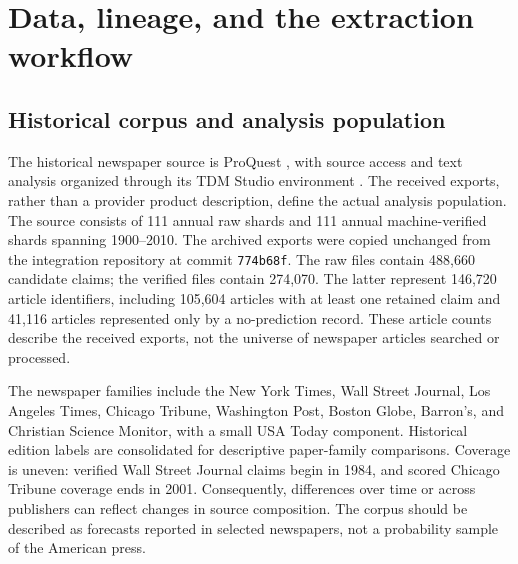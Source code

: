 \section{Data, lineage, and the extraction workflow}
\subsection{Historical corpus and analysis population}
The historical newspaper source is ProQuest \citep{proquesthistorical}, with source access and text analysis organized through its TDM Studio environment \citep{proquesttdm}. The received exports, rather than a provider product description, define the actual analysis population. The source consists of 111 annual raw shards and 111 annual machine-verified shards spanning 1900--2010. The archived exports were copied unchanged from the integration repository at commit \texttt{774b68f}. The raw files contain 488,660 candidate claims; the verified files contain 274,070. The latter represent 146,720 article identifiers, including 105,604 articles with at least one retained claim and 41,116 articles represented only by a no-prediction record. These article counts describe the received exports, not the universe of newspaper articles searched or processed.

The newspaper families include the New York Times, Wall Street Journal, Los Angeles Times, Chicago Tribune, Washington Post, Boston Globe, Barron's, and Christian Science Monitor, with a small USA Today component. Historical edition labels are consolidated for descriptive paper-family comparisons. Coverage is uneven: verified Wall Street Journal claims begin in 1984, and scored Chicago Tribune coverage ends in 2001. Consequently, differences over time or across publishers can reflect changes in source composition. The corpus should be described as forecasts reported in selected newspapers, not a probability sample of the American press.

